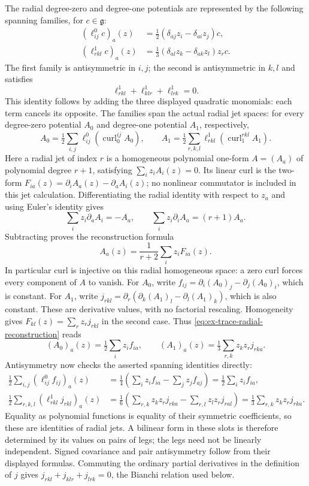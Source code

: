 The radial degree-zero and degree-one
potentials are represented by the following spanning families, for $c\in\mathfrak g$:
\begin{align*}
 (\ell^0_{ij}c)_a(z)&=\tfrac12(\delta_{aj}z_i-\delta_{ai}z_j)c,\\
 (\ell^1_{rkl}c)_a(z)&=\tfrac13(\delta_{al}z_k-\delta_{ak}z_l)z_r c.
\end{align*}
The first family is antisymmetric in $i,j$; the second is antisymmetric in
$k,l$ and satisfies
\[
 \ell^1_{rkl}+\ell^1_{klr}+\ell^1_{lrk}=0.
\]
This identity follows by adding the three displayed quadratic monomials:
each term cancels its opposite. The families span the actual radial jet
spaces: for every degree-zero potential $A_0$ and degree-one potential
$A_1$, respectively,
\[
 A_0=\tfrac12\sum_{i,j}\ell^0_{ij}(\operatorname{curl}_0^{ij}A_0),
 \qquad
 A_1=\tfrac12\sum_{r,k,l}\ell^1_{rkl}(\operatorname{curl}_1^{rkl}A_1).
\]
Here a radial jet of index $r$ is a homogeneous polynomial one-form
$A=(A_a)$ of polynomial degree $r+1$, satisfying
$\sum_i z_iA_i(z)=0$. Its linear curl is the two-form
$F_{ia}(z)=\partial_iA_a(z)-\partial_aA_i(z)$; no nonlinear
commutator is included in this jet calculation. Differentiating the radial
identity with respect to $z_a$ and using Euler's identity gives
\[
 \sum_i z_i\partial_aA_i=-A_a,\qquad
 \sum_i z_i\partial_iA_a=(r+1)A_a.
\]
Subtracting proves the reconstruction formula
\begin{equation}\label{eq:ex-trace-radial-reconstruction}
 A_a(z)=\frac1{r+2}\sum_i z_iF_{ia}(z).
\end{equation}
In particular curl is injective on this radial homogeneous space: a zero
curl forces every component of $A$ to vanish. For $A_0$, write
$f_{ij}=\partial_i(A_0)_j-\partial_j(A_0)_i$, which is constant.
For $A_1$, write
$j_{rkl}=\partial_r(\partial_k(A_1)_l-\partial_l(A_1)_k)$,
which is also constant. These are derivative values, with no factorial
rescaling. Homogeneity gives $F_{kl}(z)=\sum_r z_rj_{rkl}$ in the
second case. Thus \eqref{eq:ex-trace-radial-reconstruction} reads
\[
 (A_0)_a(z)=\tfrac12\sum_i z_if_{ia},\qquad
 (A_1)_a(z)=\tfrac13\sum_{r,k}z_kz_rj_{rka}.
\]
Antisymmetry now checks the asserted spanning identities directly:
\begin{align*}
 \tfrac12\sum_{i,j}(\ell^0_{ij}f_{ij})_a(z)
 &=\tfrac14\left(\sum_i z_if_{ia}-\sum_jz_jf_{aj}\right)
   =\tfrac12\sum_i z_if_{ia},\\
 \tfrac12\sum_{r,k,l}(\ell^1_{rkl}j_{rkl})_a(z)
 &=\tfrac16\left(\sum_{r,k}z_kz_rj_{rka}
                  -\sum_{r,l}z_lz_rj_{ral}\right)
   =\tfrac13\sum_{r,k}z_kz_rj_{rka}.
\end{align*}
Equality as polynomial functions is equality of their symmetric
coefficients, so these are identities of radial jets. A bilinear form in
these slots is therefore determined by its values on pairs of legs;
the legs need not be linearly independent. Signed covariance and pair
antisymmetry follow from their displayed formulas. Commuting the ordinary
partial derivatives in the definition of $j$ gives
$j_{rkl}+j_{klr}+j_{lrk}=0$, the Bianchi relation used below.

